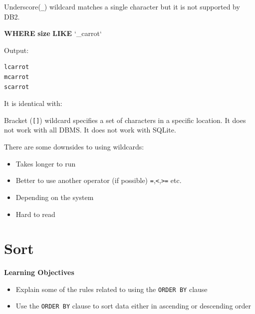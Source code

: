 \documentclass[]{book}
\makeatletter
\newenvironment{Shaded}{\begin{snugshade}}{\end{snugshade}}
\newcommand{\KeywordTok}[1]{\textcolor[rgb]{0.13,0.29,0.53}{\textbf{{#1}}}}
\newcommand{\NormalTok}[1]{{#1}}
\providecommand{\tightlist}{%
  \setlength{\itemsep}{0pt}\setlength{\parskip}{0pt}}
\newenvironment{kframe}{%
\medskip{}
\setlength{\fboxsep}{.8em}
 \def\at@end@of@kframe{}%
 \ifinner\ifhmode%
  \def\at@end@of@kframe{\end{minipage}}%
  \begin{minipage}{\columnwidth}%
 \fi\fi%
 \def\FrameCommand##1{\hskip\@totalleftmargin \hskip-\fboxsep
 \colorbox{shadecolor}{##1}\hskip-\fboxsep
     \hskip-\linewidth \hskip-\@totalleftmargin \hskip\columnwidth}%
 \MakeFramed {\advance\hsize-\width
   \@totalleftmargin\z@ \linewidth\hsize
   \@setminipage}}%
 {\par\unskip\endMakeFramed%
 \at@end@of@kframe}
\renewenvironment{Shaded}{\begin{kframe}}{\end{kframe}}
\theoremstyle{definition}
\theoremstyle{definition}
\theoremstyle{remark}
\makeatother
\begin{document}
Underscore(\texttt{\_}) wildcard matches a single character but it is
not supported by DB2.

\begin{Shaded}
\begin{Highlighting}[]
\KeywordTok{WHERE} \KeywordTok{size} \KeywordTok{LIKE} \NormalTok{`_carrot`}
\end{Highlighting}
\end{Shaded}

Output:

\begin{verbatim}
lcarrot
mcarrot
scarrot
\end{verbatim}

It is identical with:

\begin{Shaded}
\end{Shaded}

Bracket (\texttt{{[}{]}}) wildcard specifies a set of characters in a
specific location. It does not work with all DBMS. It does not work with
SQLite.

There are some downsides to using wildcards:

\begin{itemize}
\tightlist
\item
  Takes longer to run
\item
  Better to use another operator (if possible)
  \texttt{=},\texttt{\textless{}},\texttt{\textgreater{}=} etc.
\item
  Depending on the system
\item
  Hard to read
\end{itemize}

\section{Sort}\label{sort}

\textbf{Learning Objectives}

\begin{itemize}
\tightlist
\item
  Explain some of the rules related to using the \texttt{ORDER\ BY}
  clause
\item
  Use the \texttt{ORDER\ BY} clause to sort data either in ascending or
  descending order
\end{itemize}
\end{document}
